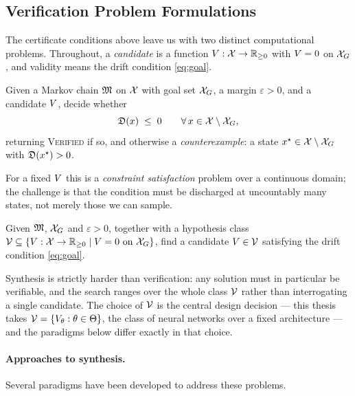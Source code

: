 \subsection{Verification Problem Formulations}
\label{subsec:verification}

The certificate conditions above leave us with two distinct computational
problems. Throughout, a \emph{candidate} is a function
$V : \mathcal{X} \to \mathbb{R}_{\geq 0}$ with $V = 0$ on $\mathcal{X}_G$, and validity means
the drift condition \eqref{eq:goal}.

\begin{definition}
\label{def:verification}
Given a Markov chain $\mathfrak{M}$ on $\mathcal{X}$ with goal set $\mathcal{X}_G$, a margin
$\varepsilon > 0$, and a candidate $V$, decide whether
%
\begin{equation*}
    \mathfrak{D}(x) \;\leq\; 0 \qquad \forall\, x \in \mathcal{X} \setminus \mathcal{X}_G ,
\end{equation*}
%
returning \textup{\textsc{Verified}} if so, and otherwise a \emph{counterexample}: a
state $x^\star \in \mathcal{X} \setminus \mathcal{X}_G$ with $\mathfrak{D}(x^\star) > 0$.
\end{definition}

For a fixed $V$ this is a \textit{constraint satisfaction} problem over a
continuous domain; the challenge is that the condition must be discharged at
uncountably many states, not merely those we can sample.

\begin{definition}
\label{def:synthesis}
Given $\mathfrak{M}$, $\mathcal{X}_G$ and $\varepsilon > 0$, together with a hypothesis class
$\mathcal{V} \subseteq \{V : \mathcal{X} \to \mathbb{R}_{\geq 0} \mid V = 0 \text{ on } \mathcal{X}_G\}$,
find a candidate $V \in \mathcal{V}$ satisfying the drift condition
\eqref{eq:goal}.
\end{definition}

Synthesis is strictly harder than verification: any solution must in
particular be verifiable, and the search ranges over the whole class $\mathcal{V}$
rather than interrogating a single candidate. The choice of $\mathcal{V}$ is the
central design decision --- this thesis takes $\mathcal{V} = \{V_\theta : \theta
\in \Theta\}$, the class of neural networks over a fixed architecture ---
and the paradigms below differ exactly in that choice.

\paragraph{Approaches to synthesis.} Several paradigms have been developed to
address these problems.


